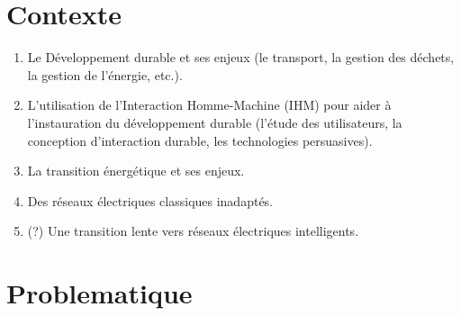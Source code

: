 \documentclass[]{pandoc/sigchi}
\begin{document}
\let\oldsubfloat\subfloat
\renewcommand*{\subfloat}{\hfill\oldsubfloat}


\levelup

\section{Contexte}\label{contexte}

\begin{enumerate}
\def\labelenumi{\arabic{enumi}.}
\itemsep1pt\parskip0pt
\item
  Le Développement durable et ses enjeux (le transport, la gestion des
  déchets, la gestion de l'énergie, etc.).
\item
  L'utilisation de l'Interaction Homme-Machine (IHM) pour aider à
  l'instauration du développement durable (l'étude des utilisateurs, la
  conception d'interaction durable, les technologies persuasives).
\item
  La transition énergétique et ses enjeux.
\item
  Des réseaux électriques classiques inadaptés.
\item
  (?) Une transition lente vers réseaux électriques intelligents.
\end{enumerate}

\section{Problematique}\label{problematique}
\end{document}
